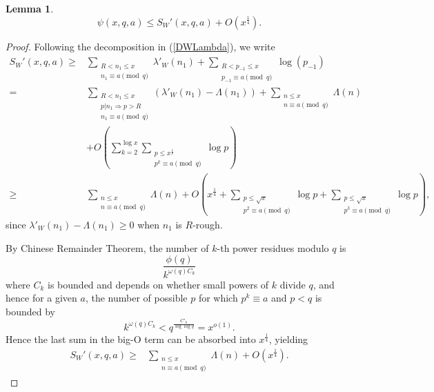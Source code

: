 \documentclass{amsart}
\newtheorem{lemma}[theorem]{Lemma}
\begin{document}
\begin{lemma}\label{psibd}
$$\psi(x,q,a)\leq S_W'(x,q,a)+O\left(x^\frac 14\right).$$
\end{lemma}
\begin{proof}
Following the decomposition in (\ref{DWLambda}), we write
\begin{align*}
S_W'(x,q,a)\geq &\sum_{\substack{R<n_1\leq x \\ n_1\equiv a\pmod q}}\lambda'_W\left(n_1\right)+\sum_{\substack{R<p_{-1}\leq x\\ p_{-1}\equiv a\pmod q}}\log \left(p_{-1}\right)\\
=&\sum_{\substack{R<n_1\leq x \\ p|n_1\Rightarrow p>R \\ n_1\equiv a\pmod q}}\left(\lambda'_W\left(n_1\right)-\Lambda\left(n_1\right)\right)+\sum_{\substack{n\leq x \\ n\equiv a\pmod q}}\Lambda\left(n\right)\\
&+O\left(\sum_{k=2}^{\log x}\sum_{\substack{p\leq x^\frac 1k \\ p^k\equiv a\pmod q}}\log p\right)\\
\geq &\sum_{\substack{n\leq x \\ n\equiv a\pmod q}}\Lambda\left(n\right)+O\left(x^\frac 14+\sum_{\substack{p\leq \sqrt x \\ p^2\equiv a\pmod q}}\log p+\sum_{\substack{p\leq \sqrt x \\ p^3\equiv a\pmod q}}\log p\right),
\end{align*}
since $\lambda'_W(n_1)-\Lambda(n_1)\geq 0$ when $n_1$ is $R$-rough.  

By Chinese Remainder Theorem, the number of $k$-th power residues modulo $q$ is $$\frac{\phi(q)}{k^{\omega(q)C_k}}$$ where $C_k$ is bounded and depends on whether small powers of $k$ divide $q$, and hence for a given $a$, the number of possible $p$ for which $p^k\equiv a$ and $p<q$ is bounded by $$k^{\omega(q)C_k}< q^{\frac{C'_k}{\log\log q}}=x^{o(1)}.$$  Hence the last sum in the big-O term can be absorbed into $x^\frac 14$, yielding
\begin{align*}
S_W'(x,q,a)\geq &\sum_{\substack{n\leq x \\ n\equiv a\pmod q}}\Lambda\left(n\right)+O\left(x^\frac 14\right).
\end{align*}
 

\end{proof}
\end{document}
